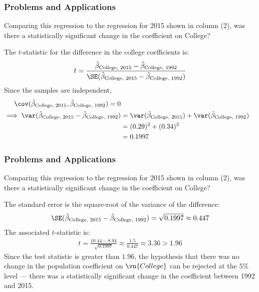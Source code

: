 \begin{frame}
\frametitle{Problems and Applications}
Comparing this regression to the regression for 2015 shown in column (2), was there a statistically significant change in the coefficient on College?
\begin{answer}
The $t$-statistic for the difference in the college coefficients is:
\begin{align*}
t = \frac{\hat{\beta}_{\text{College, 2015}}-\hat{\beta}_{\text{College, 1992}}}{\SE(\hat{\beta}_{\text{College, 2015}}-\hat{\beta}_{\text{College, 1992}})}
\end{align*}
Since the samples are independent,
\begin{align*}
\cov(\hat{\beta}_{\text{College, 2015}},\hat{\beta}_{\text{College, 1992}}) = 0\\
\implies
\var(\hat{\beta}_{\text{College, 2015}}-\hat{\beta}_{\text{College, 1992}})
  & = \var(\hat{\beta}_{\text{College, 2015}})
  + \var(\hat{\beta}_{\text{College, 1992}})\\
  & = (0.29)^{2} + (0.34)^{2}\\
  & = 0.1997
\end{align*}
\end{answer}
\end{frame}


\begin{frame}
\frametitle{Problems and Applications}
Comparing this regression to the regression for 2015 shown in column (2), was there a statistically significant change in the coefficient on College?
\begin{answer}
The standard error is the square-root of the variance of the difference:
\begin{align*}
\SE(\hat{\beta}_{\text{College, 2015}}-\hat{\beta}_{\text{College, 1992}})
  = \sqrt{0.1997}
  \approx 0.447
\end{align*}
The associated $t$-statistic is:
\begin{align*}
t = \frac{10.44-8.94}{\sqrt{0.1997}}
  \approx 
  \frac{1.5}{0.447}
  \approx 3.36 > 1.96
\end{align*} 
Since the test statistic is greater than $1.96$, the hypothesis that there was no change in the population coefficient on $\vn{College}$ can be rejected at the $5\%$ level --- there was a statistically significant change in the coefficient between 1992 and 2015.
\end{answer}
\end{frame}



